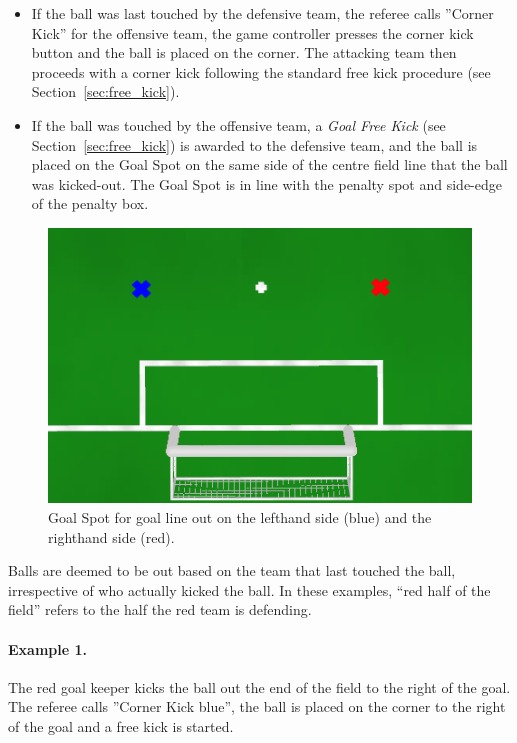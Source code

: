 \documentclass[12pt]{article}
\begin{document}
\begin{itemize}

\item If the ball was last touched by the defensive team, the referee calls ''Corner Kick'' for the offensive team, the game controller presses the corner kick button and the ball is placed on the corner.
The attacking team then proceeds with a corner kick following the standard free kick procedure (see Section~\ref{sec:free_kick}).

\item If the ball was touched by the offensive team, a \emph{Goal Free Kick} (see Section~\ref{sec:free_kick}) is awarded to the defensive team, and the ball is
placed on the Goal Spot on the same side of the centre field line that the ball was kicked-out. The Goal Spot is in
line with the penalty spot and side-edge of the penalty box. 

\end{itemize}

\begin{figure}[t]
\centerline{\includegraphics[width=0.7\columnwidth]{figs/goal-kick-spots.png}}
\caption{Goal Spot for goal line out on the lefthand side (blue) and the righthand side (red).}
\label{fig:goal_free_kick}
\end{figure}

Balls are deemed to be out based on the team that last touched the ball, irrespective of who actually kicked the ball.  In these examples, ``red half of the field'' refers to the half the red team is defending.

\paragraph{Example 1.} The red goal keeper kicks the ball out the end of the field to the right of the goal. The referee calls ''Corner Kick blue'', the ball is placed on the corner to the right of the goal and a free kick is started.
\end{document}
